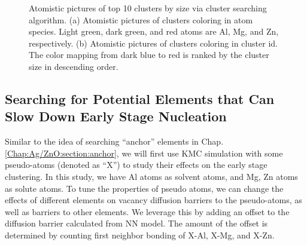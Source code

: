 \begingroup
\begin{figure}[!ht]
  \centering
\caption[Atomistic pictures of top 10 clusters by size via cluster searching algorithm.]{Atomistic pictures of top 10 clusters by size via cluster searching algorithm. (a) Atomistic pictures of clusters coloring in atom species. Light green, dark green, and red atoms are Al, Mg, and Zn, respectively. (b) Atomistic pictures of clusters coloring in cluster id. The color mapping from dark blue to red is ranked by the cluster size in descending order.}
\label{Chap:Al/Vac:fig:illu_cluster}
\end{figure}
\endgroup


\subsection{Searching for Potential Elements that Can Slow Down Early Stage Nucleation}
Similar to the idea of searching ``anchor'' elements in Chap. \ref{Chap:Ag/ZnO:section:anchor}, we will first use \ac{KMC} simulation with some pseudo-atoms (denoted as ``X'') to study their effects on the early stage clustering. In this study, we have Al atoms as solvent atoms, and Mg, Zn atoms as solute atoms. To tune the properties of pseudo atoms, we can change the effects of different elements on vacancy diffusion barriers to the pseudo-atoms, as well as barriers to other elements. We leverage this by adding an offset to the diffusion barrier calculated from \ac{NN} model. The amount of the offset is determined by counting first neighbor bonding of X-Al, X-Mg, and X-Zn.